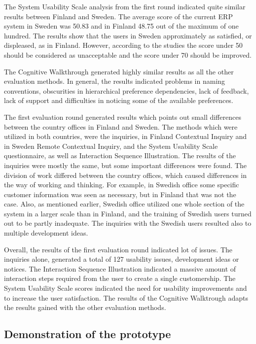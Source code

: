 \documentclass[12pt,a4paper,oneside,pdftex]{report}
\begin{document}
The System Usability Scale analysis from the first round indicated quite similar results between Finland and Sweden. The average score of the current ERP system in Sweden was 50.83 and in Finland 48.75 out of the maximum of one hundred. The results show that the users in Sweden approximately as satisfied, or displeased, as in Finland. However, according to the studies \citep{RefWorks:12} the score under 50 should be considered as unacceptable and the score under 70 should be improved. 

The Cognitive Walkthrough generated highly similar results as all the other evaluation methods. In general, the results indicated problems in naming conventions, obscurities in hierarchical preference dependencies, lack of feedback, lack of support and difficulties in noticing some of the available preferences. 

The first evaluation round generated results which points out small differences between the country offices in Finland and Sweden. The methods which were utilized in both countries, were the inquiries, in Finland Contextual Inquiry and in Sweden Remote Contextual Inquiry, and the System Usability Scale questionnaire, as well as Interaction Sequence Illustration. The results of the inquiries were mostly the same, but some important differences were found. The division of work differed between the country offices, which caused differences in the way of working and thinking. For example, in Swedish office some specific customer information was seen as necessary, but in Finland that was not the case. Also, as mentioned earlier, Swedish office utilized one whole section of the system in a larger scale than in Finland, and the training of Swedish users turned out to be partly inadequate. The inquiries with the Swedish users resulted also to multiple development ideas. 

Overall, the results of the first evaluation round indicated lot of issues. The inquiries alone, generated a total of 127 usability issues, development ideas or notices. The Interaction Sequence Illustration indicated a massive amount of interaction steps required from the user to create a single customership. The System Usability Scale scores indicated the need for usability improvements and to increase the user satisfaction. The results of the Cognitive Walktrough adapts the results gained with the other evaluation methods. 




\subsection{Demonstration of the prototype}
\label{sec:demoproto}
\end{document}
